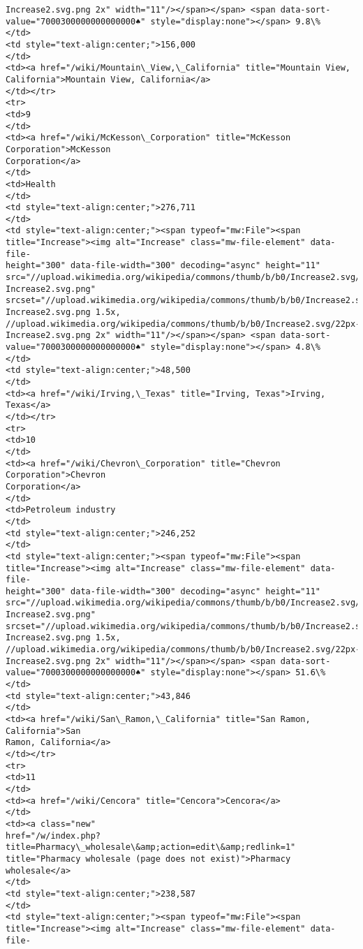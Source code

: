 \documentclass[11pt]{article}
\begin{document}
\begin{Verbatim}[commandchars=\\\{\}]
Increase2.svg.png 2x" width="11"/></span></span> <span data-sort-
value="7000300000000000000♠" style="display:none"></span> 9.8\%
</td>
<td style="text-align:center;">156,000
</td>
<td><a href="/wiki/Mountain\_View,\_California" title="Mountain View,
California">Mountain View, California</a>
</td></tr>
<tr>
<td>9
</td>
<td><a href="/wiki/McKesson\_Corporation" title="McKesson Corporation">McKesson
Corporation</a>
</td>
<td>Health
</td>
<td style="text-align:center;">276,711
</td>
<td style="text-align:center;"><span typeof="mw:File"><span
title="Increase"><img alt="Increase" class="mw-file-element" data-file-
height="300" data-file-width="300" decoding="async" height="11"
src="//upload.wikimedia.org/wikipedia/commons/thumb/b/b0/Increase2.svg/11px-
Increase2.svg.png"
srcset="//upload.wikimedia.org/wikipedia/commons/thumb/b/b0/Increase2.svg/17px-
Increase2.svg.png 1.5x,
//upload.wikimedia.org/wikipedia/commons/thumb/b/b0/Increase2.svg/22px-
Increase2.svg.png 2x" width="11"/></span></span> <span data-sort-
value="7000300000000000000♠" style="display:none"></span> 4.8\%
</td>
<td style="text-align:center;">48,500
</td>
<td><a href="/wiki/Irving,\_Texas" title="Irving, Texas">Irving, Texas</a>
</td></tr>
<tr>
<td>10
</td>
<td><a href="/wiki/Chevron\_Corporation" title="Chevron Corporation">Chevron
Corporation</a>
</td>
<td>Petroleum industry
</td>
<td style="text-align:center;">246,252
</td>
<td style="text-align:center;"><span typeof="mw:File"><span
title="Increase"><img alt="Increase" class="mw-file-element" data-file-
height="300" data-file-width="300" decoding="async" height="11"
src="//upload.wikimedia.org/wikipedia/commons/thumb/b/b0/Increase2.svg/11px-
Increase2.svg.png"
srcset="//upload.wikimedia.org/wikipedia/commons/thumb/b/b0/Increase2.svg/17px-
Increase2.svg.png 1.5x,
//upload.wikimedia.org/wikipedia/commons/thumb/b/b0/Increase2.svg/22px-
Increase2.svg.png 2x" width="11"/></span></span> <span data-sort-
value="7000300000000000000♠" style="display:none"></span> 51.6\%
</td>
<td style="text-align:center;">43,846
</td>
<td><a href="/wiki/San\_Ramon,\_California" title="San Ramon, California">San
Ramon, California</a>
</td></tr>
<tr>
<td>11
</td>
<td><a href="/wiki/Cencora" title="Cencora">Cencora</a>
</td>
<td><a class="new"
href="/w/index.php?title=Pharmacy\_wholesale\&amp;action=edit\&amp;redlink=1"
title="Pharmacy wholesale (page does not exist)">Pharmacy wholesale</a>
</td>
<td style="text-align:center;">238,587
</td>
<td style="text-align:center;"><span typeof="mw:File"><span
title="Increase"><img alt="Increase" class="mw-file-element" data-file-

\end{Verbatim}
\end{document}
